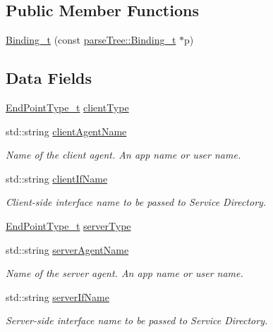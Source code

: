 \subsection*{Public Member Functions}
\begin{DoxyCompactItemize}
\item 
\hyperlink{structmodel_1_1_binding__t_a3f25876473de4e48119a9d3e2d29b984}{Binding\+\_\+t} (const \hyperlink{structparse_tree_1_1_binding__t}{parse\+Tree\+::\+Binding\+\_\+t} $\ast$p)
\end{DoxyCompactItemize}
\subsection*{Data Fields}
\begin{DoxyCompactItemize}
\item 
\hyperlink{structmodel_1_1_binding__t_a52144bd55340eb27c7a2446d8bd41909}{End\+Point\+Type\+\_\+t} \hyperlink{structmodel_1_1_binding__t_a4bac2608cb98d165467423924f9c0f31}{client\+Type}
\item 
std\+::string \hyperlink{structmodel_1_1_binding__t_a1a880464f3118670bc2448f05bdd558c}{client\+Agent\+Name}
\begin{DoxyCompactList}\small\item\em Name of the client agent. An app name or user name. \end{DoxyCompactList}\item 
std\+::string \hyperlink{structmodel_1_1_binding__t_adbba79fca15d61608fad545133338907}{client\+If\+Name}
\begin{DoxyCompactList}\small\item\em Client-\/side interface name to be passed to Service Directory. \end{DoxyCompactList}\item 
\hyperlink{structmodel_1_1_binding__t_a52144bd55340eb27c7a2446d8bd41909}{End\+Point\+Type\+\_\+t} \hyperlink{structmodel_1_1_binding__t_a68d5c2bf7a05e0619b1e2704b8f931ed}{server\+Type}
\item 
std\+::string \hyperlink{structmodel_1_1_binding__t_ad40c0c6b7258030addaee688b9c910ba}{server\+Agent\+Name}
\begin{DoxyCompactList}\small\item\em Name of the server agent. An app name or user name. \end{DoxyCompactList}\item 
std\+::string \hyperlink{structmodel_1_1_binding__t_aa1c6f9af2089f0734bd4465529584df8}{server\+If\+Name}
\begin{DoxyCompactList}\small\item\em Server-\/side interface name to be passed to Service Directory. \end{DoxyCompactList}\item 

\end{DoxyCompactItemize}
